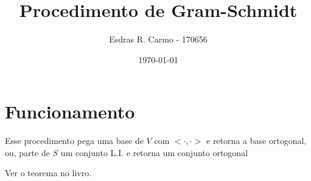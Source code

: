 \documentclass{article}
\author{Esdras R. Carmo - 170656}
\title{Procedimento de Gram-Schmidt}
\date{\today}
\newcommand{\interno}[0] {<\cdot, \cdot>}
\begin{document}
    \maketitle

    \section{Funcionamento}
        Esse procedimento pega uma base de $V$ com $\interno$ e retorna a base ortogonal, ou,
        parte de $S$ um conjunto L.I. e retorna um conjunto ortogonal

        Ver o teorema no livro.
\end{document}
